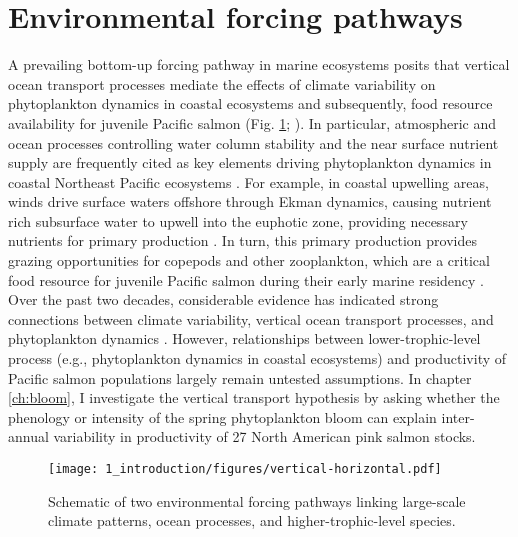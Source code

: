 

\section{Environmental forcing pathways}

A prevailing bottom-up forcing pathway in marine ecosystems posits that vertical
ocean transport processes mediate the effects of climate variability on
phytoplankton dynamics in coastal ecosystems and subsequently, food resource
availability for juvenile Pacific salmon (Fig. \ref{fig:intro:1};
\citealp{DiLorenzo2013b, Rykaczewski2008a, Ware1991a}). In particular,
atmospheric and ocean processes controlling water column stability and the near
surface nutrient supply are frequently cited as key elements driving
phytoplankton dynamics in coastal Northeast Pacific ecosystems
\citep{Henson2007a, Gargett1997a}. For example, in coastal upwelling areas,
winds drive surface waters offshore through Ekman dynamics, causing nutrient
rich subsurface water to upwell into the euphotic zone, providing necessary
nutrients for primary production \citep{Huyer1983}. In turn, this primary
production provides grazing opportunities for copepods and other zooplankton,
which are a critical food resource for juvenile Pacific salmon during their
early marine residency \citep{Armstrong2008a, Beauchamp2007a, Brodeur2007a}.
Over the past two decades, considerable evidence has indicated strong
connections between climate variability, vertical ocean transport processes, and
phytoplankton dynamics \citep{Chenillat2012, Polovina1995a, Henson2007a,
Henson2007b, Stabeno2004a, Weingartner2002a}. However, relationships between
lower-trophic-level process (e.g., phytoplankton dynamics in coastal ecosystems)
and productivity of Pacific salmon populations largely remain untested
assumptions. In chapter \ref{ch:bloom}, I investigate the vertical transport
hypothesis by asking whether the phenology or intensity of the spring
phytoplankton bloom can explain inter-annual variability in productivity of 27
North American pink salmon stocks.

\begin{figure}[htbp]
  \centering
  \texttt{[image: 1\_introduction/figures/vertical-horizontal.pdf]}
  \caption[Schematic of two environmental forcing pathways]{Schematic of two
           environmental forcing pathways linking large-scale climate patterns,
           ocean processes, and higher-trophic-level species.}
  \label{fig:intro:1}
\end{figure}

